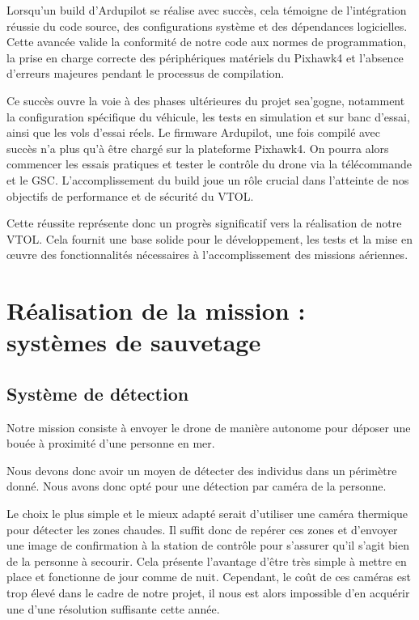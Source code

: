\documentclass[a4paper,12pt,french]{report}
\begin{document}
Lorsqu'un build d'Ardupilot se réalise avec succès, cela témoigne de l'intégration réussie du code source, des configurations système et des dépendances logicielles. Cette avancée valide la conformité de notre code aux normes de programmation, la prise en charge correcte des périphériques matériels du Pixhawk4 et l'absence d'erreurs majeures pendant le processus de compilation.\newline

Ce succès ouvre la voie à des phases ultérieures du projet sea’gogne, notamment la configuration spécifique du véhicule, les tests en simulation et sur banc d'essai, ainsi que les vols d'essai réels. Le firmware Ardupilot, une fois compilé avec succès n’a plus qu’à être chargé sur la plateforme Pixhawk4. On pourra alors commencer les essais pratiques et tester le contrôle du drone via la télécommande et le GSC. L’accomplissement du build joue un rôle crucial dans l'atteinte de nos objectifs de performance et de sécurité du VTOL.\newline

Cette réussite représente donc un progrès significatif vers la réalisation de notre VTOL. Cela fournit une base solide pour le développement, les tests et la mise en œuvre des fonctionnalités nécessaires à l'accomplissement des missions aériennes.


\chapter{Réalisation de la mission : systèmes de sauvetage}

\section{Système de détection}

Notre mission consiste à envoyer le drone de manière autonome pour déposer une bouée à proximité d'une personne en mer. \newline

Nous devons donc avoir un moyen de détecter des individus dans un périmètre donné. Nous avons donc opté pour une détection par caméra de la personne.\newline

Le choix le plus simple et le mieux adapté serait d'utiliser une caméra thermique pour détecter les zones chaudes. Il suffit donc de repérer ces zones et d'envoyer une image de confirmation à la station de contrôle pour s'assurer qu'il s'agit bien de la personne à secourir. Cela présente l'avantage d'être très simple à mettre en place et fonctionne de jour comme de nuit. Cependant, le coût de ces caméras est trop élevé dans le cadre de notre projet, il nous est alors impossible d'en acquérir une d'une résolution suffisante cette année.\newline
\end{document}
